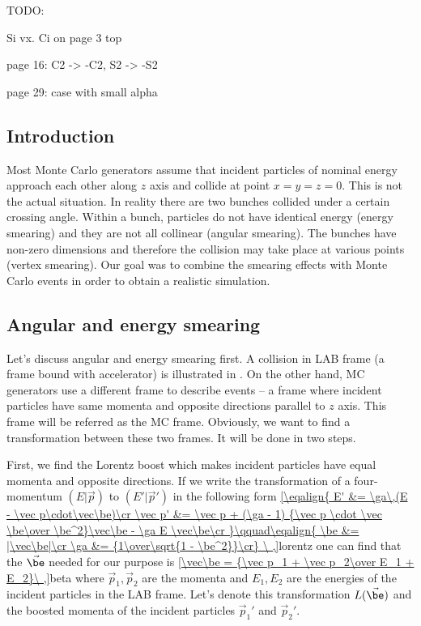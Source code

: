 TODO:

Si vx. Ci on page 3 top

page 16: C2 -> -C2, S2 -> -S2

page 29: case with small alpha

\subsection{Introduction}

Most Monte Carlo generators assume that incident particles of nominal energy approach each other along $z$ axis and collide at point $x = y = z = 0$. This is not the actual situation. In reality there are two bunches collided under a certain crossing angle. Within a bunch, particles do not have identical energy (energy smearing) and they are not all collinear (angular smearing). The bunches have non-zero dimensions and therefore the collision may take place at various points (vertex smearing). Our goal was to combine the smearing effects with Monte Carlo events in order to obtain a realistic simulation.


\subsection{Angular and energy smearing}

Let's discuss angular and energy smearing first. A collision in LAB frame (a frame bound with accelerator) is illustrated in . On the other hand, MC generators use a different frame to describe events -- a frame where incident particles have same momenta and opposite directions parallel to $z$ axis. This frame will be referred as the MC frame. Obviously, we want to find a transformation between these two frames. It will be done in two steps. 


\vfil\eject
First, we find the Lorentz boost which makes incident particles have equal momenta and opposite directions. If we write the transformation of a four-momentum $(E|\vec p)$ to $(E'|\vec p')$ in the following form
\eqref{\eqalign{
E'      &= \ga\,(E - \vec p\cdot\vec\be)\cr
\vec p' &= \vec p  +  (\ga - 1) {\vec p \cdot \vec \be\over \be^2}\vec\be - \ga E \vec\be\cr
}\qquad\eqalign{
\be &= |\vec\be|\cr
\ga &= {1\over\sqrt{1 - \be^2}}\cr}
\ ,}{lorentz}
one can find that the $\vec\be$ needed for our purpose is
\eqref{\vec\be = {\vec p_1 + \vec p_2\over E_1 + E_2}\ ,}{beta}
where $\vec p_1, \vec p_2$ are the momenta and $E_1, E_2$ are the energies of the incident particles in the LAB frame. Let's denote this transformation $L(\vec\be)$ and the boosted momenta of the incident particles $\vec p_1'$ and $\vec p_2'$.

